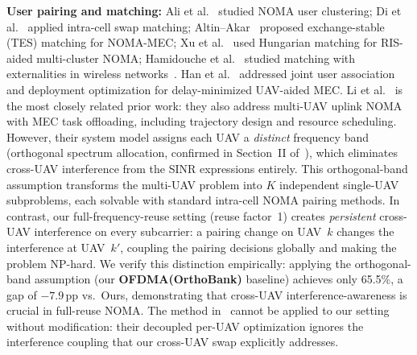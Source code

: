 \documentclass[journal]{IEEEtran}
\begin{document}
\textbf{User pairing and matching:} Ali et al.~\cite{ali2016dynamic} studied NOMA user clustering; Di et al.~\cite{di2017sub} applied intra-cell swap matching; Altin--Akar~\cite{altin2022hybrid} proposed exchange-stable (TES) matching for NOMA-MEC; Xu et al.~\cite{xu2025dynamic} used Hungarian matching for RIS-aided multi-cluster NOMA; Hamidouche et al.~\cite{hamidouche2017matching} studied matching with externalities in wireless networks~\cite{pantisano2015matching}.
Han et al.~\cite{han2023joint} addressed joint user association and deployment optimization for delay-minimized UAV-aided MEC.
Li et al.~\cite{li2023joint} is the most closely related prior work: they also address multi-UAV uplink NOMA with MEC task offloading, including trajectory design and resource scheduling.
However, their system model assigns each UAV a \emph{distinct} frequency band (orthogonal spectrum allocation, confirmed in Section~II of~\cite{li2023joint}), which eliminates cross-UAV interference from the SINR expressions entirely.
This orthogonal-band assumption transforms the multi-UAV problem into $K$ independent single-UAV subproblems, each solvable with standard intra-cell NOMA pairing methods.
In contrast, our full-frequency-reuse setting (reuse factor~1) creates \emph{persistent} cross-UAV interference on every subcarrier: a pairing change on UAV~$k$ changes the interference at UAV~$k'$, coupling the pairing decisions globally and making the problem NP-hard.
We verify this distinction empirically: applying the orthogonal-band assumption (our \textbf{OFDMA(OrthoBank)} baseline) achieves only 65.5\%, a gap of $-7.9$\,pp vs.\ Ours, demonstrating that cross-UAV interference-awareness is crucial in full-reuse NOMA.
The method in~\cite{li2023joint} cannot be applied to our setting without modification: their decoupled per-UAV optimization ignores the interference coupling that our cross-UAV swap explicitly addresses.
\end{document}
